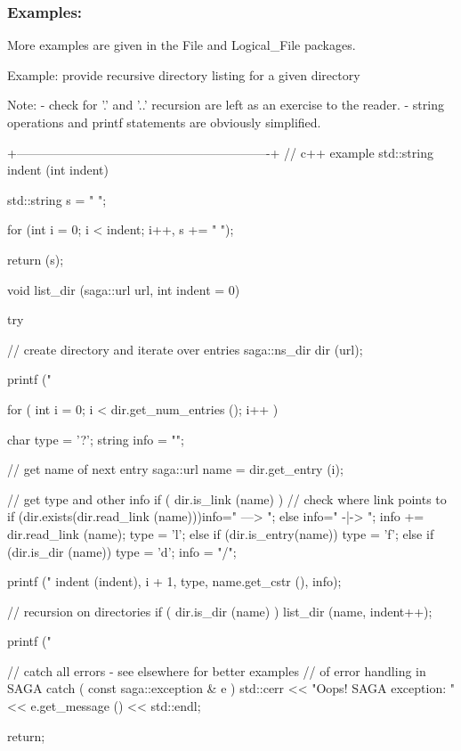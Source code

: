  
 \subsubsection{Examples:}
 
 \begin{mycode}
  More examples are given in the File and Logical_File packages.
 
  Example: provide recursive directory listing for a given
           directory
 
  Note:    - check for '.' and '..' recursion are left as an
             exercise to the reader.
           - string operations and printf statements are
             obviously simplified.
 
  +-------------------------------------------------------------+
   // c++ example
   std::string indent (int indent)
   {
     std::string s = "  ";
 
     for (int i = 0; i < indent; i++, s += "  ");
 
     return (s);
   }
 
   void list_dir (saga::url url,
                  int       indent = 0)
   {
     try
     {
       // create directory and iterate over entries
       saga::ns_dir dir (url);
 
       printf ("\n%
 
       for ( int i = 0; i < dir.get_num_entries (); i++ )
       {
         char   type = '?';
         string info = "";
 
         // get name of next entry
         saga::url name = dir.get_entry (i);
 
         // get type and other info
         if ( dir.is_link (name) )
         {
           // check where link points to
           if (dir.exists(dir.read_link (name))){info=" ---> ";}
           else                                 {info=" -|-> ";}
           info += dir.read_link (name);
           type  = 'l';
         }
         else if (dir.is_entry(name)){ type = 'f';            }
         else if (dir.is_dir  (name)){ type = 'd'; info = "/";}
 
         printf ("%
                 indent (indent), i + 1,
                 type, name.get_cstr (), info);
 
         // recursion on directories
         if ( dir.is_dir (name) )
         {
           list_dir (name, indent++);
         }
       }
 
       printf ("\n%
     }
 
     // catch all errors - see elsewhere for better examples
     // of error handling in SAGA
     catch ( const saga::exception & e )
     {
       std::cerr << "Oops! SAGA exception: "
                 << e.get_message () 
                 << std::endl;
     }
 
     return;
   }
 \end{mycode}
 
 
 
 
 
